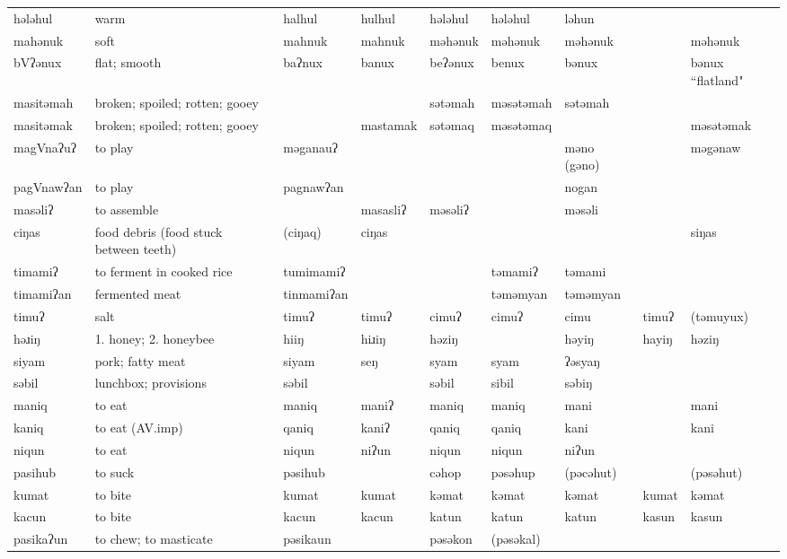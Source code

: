 \begin{landscape}
\begin{longtable}{*{9}{p{}}}
\text{*}hələhul & warm & halhul & hulhul & hələhul & hələhul & ləhun &  & \\
\text{*}mahənuk & soft & mahnuk & mahnuk & məhənuk & məhənuk & məhənuk &  & məhənuk\\
\text{*}bVʔənux & flat; smooth & baʔnux & banux & beʔənux & benux & bənux &  & bənux ``flatland"\\
\text{*}masitəmah & broken; spoiled; rotten; gooey &  &  & sətəmah & məsətəmah & sətəmah &  & \\
\text{*}masitəmak & broken; spoiled; rotten; gooey &  & mastamak & sətəmaq & məsətəmaq &  &  & məsətəmak\\
\text{*}magVnaʔuʔ & to play & məganauʔ &  &  &  & məno (gəno) &  & məgənaw\\
\text{*}pagVnawʔan & to play & pagnawʔan &  &  &  & nogan &  & \\
\text{*}masəliʔ & to assemble &  & masasliʔ & məsəliʔ &  & məsəli &  & \\
\text{*}ciŋas & food debris (food stuck between teeth) & (ciŋaq) & ciŋas &  &  &  &  & siŋas\\
\text{*}timamiʔ & to ferment in cooked rice & tumimamiʔ &  &  & təmamiʔ & təmami &  & \\
\text{*}timamiʔan & fermented meat & tinmamiʔan &  &  & təməmyan & təməmyan &  & \\
\text{*}timuʔ & salt & timuʔ & timuʔ & cimuʔ & cimuʔ & cimu & timuʔ & (təmuyux)\\
\text{*}həɹiŋ & 1. honey; 2. honeybee & hiiŋ & hiɹiŋ & həziŋ &  & həyiŋ & hayiŋ & həziŋ\\
\text{*}siyam & pork; fatty meat & siyam & seŋ & syam & syam & ʔəsyaŋ &  & \\
\text{*}səbil & lunchbox; provisions & səbil &  & səbil & sibil & səbiŋ &  & \\
\text{*}maniq & to eat & maniq & maniʔ & maniq & maniq & mani &  & mani\\
\text{*}kaniq & to eat (AV.imp) & qaniq & kaniʔ & qaniq & qaniq & kani &  & kani\\
\text{*}niqun & to eat & niqun & niʔun & niqun & niqun & niʔun &  & \\
\text{*}pasihub & to suck & pəsihub &  & cəhop & pəsəhup & (pəcəhut) &  & (pəsəhut)\\
\text{*}kumat & to bite & kumat & kumat & kəmat & kəmat & kəmat & kumat & kəmat\\
\text{*}kacun & to bite & kacun & kacun & katun & katun & katun & kasun & kasun\\
\text{*}pasikaʔun & to chew; to masticate & pəsikaun &  & pəsəkon & (pəsəkal) &  &  & \\

\end{longtable}
\end{landscape}

